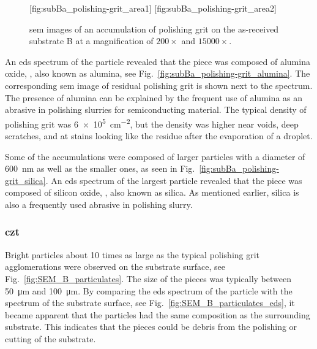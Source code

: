 \begin{figure}[htbp]
    \centering
        [fig:subBa_polishing-grit_area1]
        \hfill
        [fig:subBa_polishing-grit_area2]
    \caption[\Ac{sem} images of an accumulaton of polishing grit on substrate B.]{\Ac{sem} images of an accumulation of polishing grit on the as-received substrate B at a magnification of  $200\times$ and  $15000\times$.}\label{fig:subBa_polishing-grit_area}
\end{figure}

An \ac{eds} spectrum of the particle revealed that the piece was composed of alumina oxide, , also known as alumina, see Fig.~\ref{fig:subBa_polishing-grit_alumina}. The corresponding \ac{sem} image of residual polishing grit is shown next to the spectrum. The presence of alumina can be explained by the frequent use of alumina as an abrasive in polishing slurries for semiconducting material. The typical density of polishing grit was \SI{6e5}{\centi\metre^{-2}}, but the density was higher near voids, deep scratches, and at stains looking like the residue after the evaporation of a droplet.

Some of the accumulations were composed of larger particles with a diameter of \SI{600}{\nano\metre} as well as the smaller ones, as seen in Fig.~\ref{fig:subBa_polishing-grit_silica}. An \ac{eds} spectrum of the largest particle revealed that the piece was composed of silicon oxide, , also known as silica. As mentioned earlier, silica is also a frequently used abrasive in polishing slurry.

\subsubsection{\Ac{czt}}
Bright particles about 10 times as large as the typical polishing grit agglomerations were observed on the substrate surface, see Fig.~\ref{fig:SEM_B_particulates}. The size of the pieces was typically between \SI{50}{\micro\metre} and \SI{100}{\micro\metre}. By comparing the \ac{eds} spectrum of the particle with the spectrum of the substrate surface, see Fig.~\ref{fig:SEM_B_particulates_eds}, it became apparent that the particles had the same composition as the surrounding substrate. This indicates that the pieces could be debris from the polishing or cutting of the substrate.

